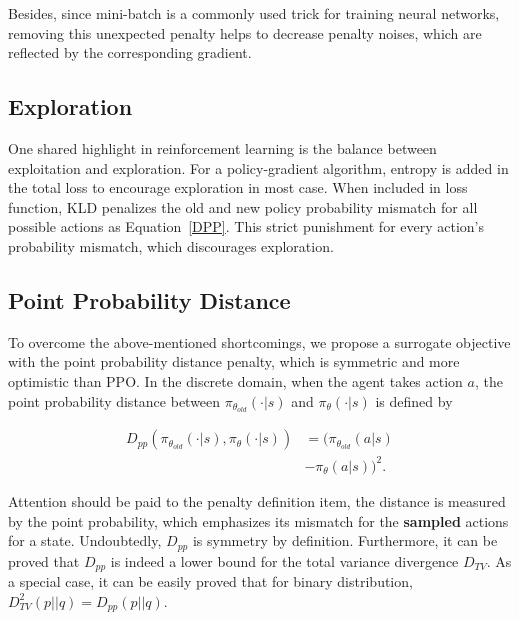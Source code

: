 \documentclass{article}
\begin{document}
Besides, since mini-batch is a commonly used trick for training neural networks, removing this unexpected penalty helps to decrease penalty noises, which are reflected by the corresponding gradient. 

\subsection{Exploration}
One shared highlight in reinforcement learning is the balance between exploitation and exploration. For a policy-gradient  algorithm, entropy is added in the total loss to encourage exploration in most case. When included in loss function, KLD penalizes the old and new policy probability mismatch for all possible actions as Equation~\ref{DPP}. This strict punishment for every action's probability mismatch, which discourages exploration.

\subsection{Point Probability Distance}

To overcome the above-mentioned shortcomings, we propose a surrogate objective with the point probability distance penalty, which is symmetric and more optimistic than PPO. In the discrete domain, when the agent takes action $a$, the point probability distance between  $\pi_{\theta_{old}}(\cdot|s)$  and  $\pi_{\theta}(\cdot|s)$   is defined by

\begin{equation}\label{PPD}
\begin{split}
D_{pp}(\pi_{\theta_{old}}(\cdot|s), \pi_{\theta}(\cdot|s))&=({\pi_{\theta_{old}}(a|s)}\\
&-{\pi_{\theta}(a|s)})^2.
\end{split}
\end{equation}

Attention should be paid to the penalty definition item, the distance is measured by the point probability, which emphasizes its mismatch for the \textbf{sampled} actions for a state.   
Undoubtedly, $D_{pp}$ is symmetry by definition. Furthermore, it can be proved that $D_{pp}$ is indeed a lower bound for the total variance divergence $D_{TV}$. As a special case, it can be easily proved that for binary distribution, $D_{TV}^2(p||q) = D_{pp}(p||q)$. 
\end{document}
